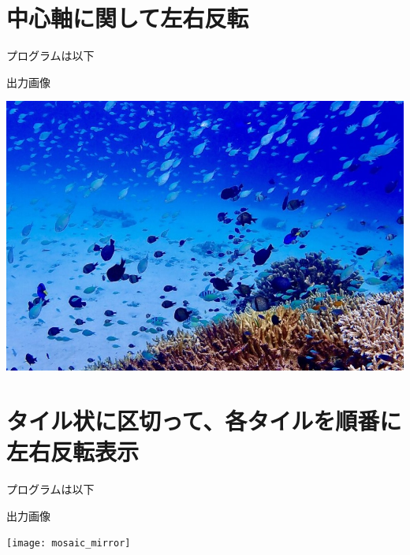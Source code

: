 \documentclass[a4paper,11pt,titlepage]{jsarticle}
\begin{document}
\section{中心軸に関して左右反転}
プログラムは以下


出力画像
\begin{center}
  \includegraphics[width=0.8\linewidth]{flipped_image.jpg} 
\end{center}

\clearpage

\section{タイル状に区切って、各タイルを順番に左右反転表示}
プログラムは以下


\clearpage

出力画像
\begin{center}
  \texttt{[image: mosaic\_mirror]} 
\end{center}
\end{document}
